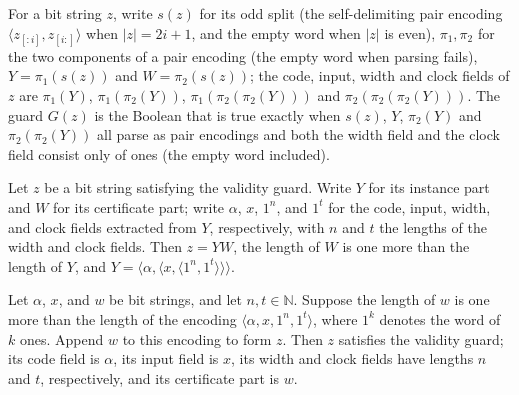 \begin{definition}
\label{Complexity.tmsatGood}
\leanok
{}
For a bit string $z$, write $s(z)$ for its odd split (the self-delimiting pair encoding $\langle z_{[:i]}, z_{[i:]}\rangle$ when $|z| = 2i+1$, and the empty word when $|z|$ is even), $\pi_1, \pi_2$ for the two components of a pair encoding (the empty word when parsing fails), $Y = \pi_1(s(z))$ and $W = \pi_2(s(z))$; the code, input, width and clock fields of $z$ are $\pi_1(Y)$, $\pi_1(\pi_2(Y))$, $\pi_1(\pi_2(\pi_2(Y)))$ and $\pi_2(\pi_2(\pi_2(Y)))$. The guard $G(z)$ is the Boolean that is true exactly when $s(z)$, $Y$, $\pi_2(Y)$ and $\pi_2(\pi_2(Y))$ all parse as pair encodings and both the width field and the clock field consist only of ones (the empty word included).
\end{definition}

\begin{lemma}
\label{Complexity.tmsat_good_spec}
\leanok
{}
Let $z$ be a bit string satisfying the validity guard. Write $Y$ for its instance part
and $W$ for its certificate part; write $\alpha$, $x$, $1^n$, and $1^t$ for the code,
input, width, and clock fields extracted from $Y$, respectively, with $n$ and $t$ the
lengths of the width and clock fields. Then $z=YW$, the length of $W$ is one more than
the length of $Y$, and $Y=\langle\alpha,\langle x,\langle1^n,1^t\rangle\rangle\rangle$.
\end{lemma}

\begin{lemma}
\label{Complexity.tmsat_good_quad}
\leanok
{}
Let $\alpha$, $x$, and $w$ be bit strings, and let $n,t\in\mathbb{N}$. Suppose the
length of $w$ is one more than the length of the encoding
$\langle\alpha,x,1^n,1^t\rangle$, where $1^k$ denotes the word of $k$ ones. Append $w$
to this encoding to form $z$. Then $z$ satisfies the validity guard; its code field is
$\alpha$, its input field is $x$, its width and clock fields have lengths $n$ and $t$,
respectively, and its certificate part is $w$.
\end{lemma}


